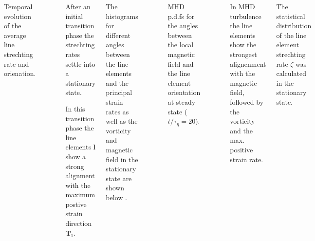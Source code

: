 \documentclass[20pt, a0paper, portrait, margin=15mm, innermargin=15mm,
     blockverticalspace=15mm, colspace=15mm, subcolspace=8mm]{tikzposter} %
\newcommand{\va}[1]{\bm{#1}}
\newcommand{\plot}[3]{
\begin{figure}[H]
    \centering
    \scriptsize
    \scalebox{1.3}{}
    \caption{\footnotesize{#2}}
    \label{#3}
\end{figure}
}
\begin{document}
\begin{columns}
{\begin{minipage}[t]{20cm}
                \plot{figures/mhd_line_evo}
                    {Temporal evolution of the average line strechting rate and
                    orienation.}
                    {line_stretching}

                \begin{itemsposter}
                    \item After an initial transition phase the strechting rates
                        settle into a stationary state.

                    \vspace{0.5cm}

                    \item In this transition phase the line elements $\va{l}$ show
                        a strong alignment with the maximum postive strain direction
                        $\va{T}_1$.
                \end{itemsposter}


                The histograms for different angles between the line elements and the
                principal strain rates as well as the vorticity and magnetic field in the
                stationary state are shown below .

                \plot{figures/histograms/mhd_angle_histo_t20}
                    {MHD p.d.fs for the angles between the local magnetic field and the
                    line element orientation at steady state ($t/\tau_{\eta} = 20$).}
                    {mhd_strain_magnetic_angle_histo}

                \begin{itemsposter}
                    \item In MHD turbulence the line elements show the strongest
                        alignenment with the magnetic field, followed by the 
                        vorticity and the max. positive strain rate.
                \end{itemsposter}


            \end{minipage}
            \hfill
            \begin{minipage}[t]{20cm}

                    
                    The statistical distribution of the line element strechting
                    rate $\zeta$ was calculated in the stationary state. 


\end{minipage}}
\end{columns}
\end{document}
